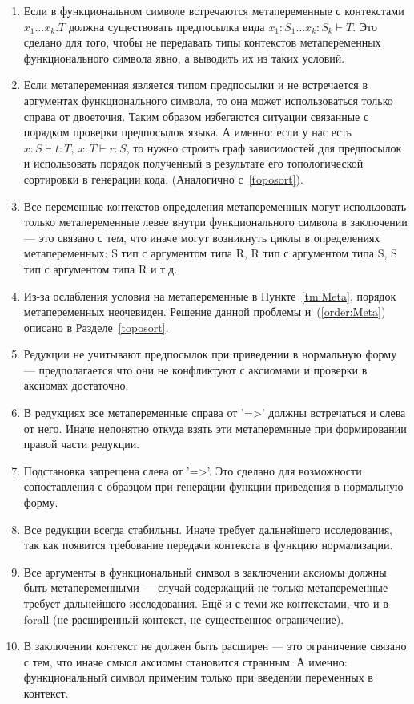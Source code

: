 \begin{enumerate}
\item Если в функциональном символе встречаются метапеременные с контекстами $x_1 \ldots x_k . T$ должна существовать предпосылка вида $x_1 : S_1 \ldots x_k : S_k  \vdash T$. Это сделано для того, чтобы не передавать типы контекстов метапеременных функционального символа явно, а выводить их из таких условий.

\item Если метапеременная является типом предпосылки и не встречается в аргументах функционального символа, то она может использоваться только справа от двоеточия. Таким образом избегаются ситуации связанные с порядком проверки предпосылок языка. А именно: если у нас есть $x : S \vdash t : T,\ x:T \vdash r : S$, то нужно строить граф зависимостей для предпосылок и использовать порядок полученный в результате его топологической сортировки в генерации кода. (Аналогично с~\ref{toposort}).

\item \label{order:Meta} Все переменные контекстов определения метапеременных могут использовать только метапеременные левее внутри функционального символа в заключении --- это связано с тем, что иначе могут возникнуть циклы в определениях метапеременных: S тип с аргументом типа R, R тип с аргументом типа S, S тип с аргументом типа R и т.д.

\item Из-за ослабления условия на метапеременные в Пункте~\ref{tm:Meta}, порядок метапеременных неочевиден. Решение данной проблемы и~(\ref{order:Meta}) описано в Разделе~\ref{toposort}.

\item Редукции не учитывают предпосылок при приведении в нормальную форму --- предполагается что они не конфликтуют с аксиомами и проверки в аксиомах достаточно.

\item В редукциях все метапеременные справа от '=>' должны встречаться и слева от него. Иначе непонятно откуда взять эти метаперемнные при формировании правой части редукции.

\item Подстановка запрещена слева от '=>'. Это сделано для возможности сопоставления с образцом при генерации функции приведения в нормальную форму.

\item Все редукции всегда стабильны. Иначе требует дальнейшего исследования, так как появится требование передачи контекста в функцию нормализации.

\item Все аргументы в функциональный символ в заключении аксиомы должны быть метапеременными --- случай содержащий не только метапеременные требует дальнейшего исследования. Ещё и с теми же контекстами, что и в forall (не расширенный контекст, не существенное ограничение).

\item В заключении контекст не должен быть расширен --- это ограничение связано с тем, что иначе смысл аксиомы становится странным. А именно: функциональный символ применим только при введении переменных в контекст.

\end{enumerate}

